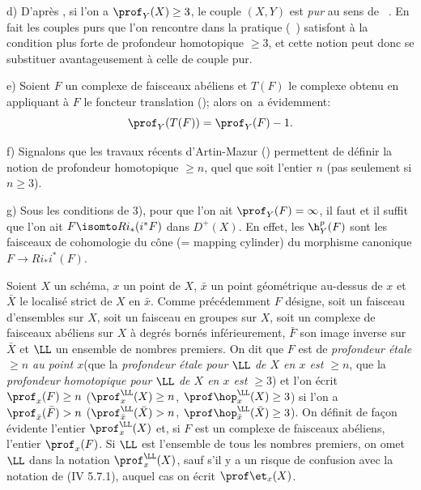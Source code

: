 \begin{remarques}
d) D'apr\`es , si l'on a $\prof_Y(X)\geq 3$, le couple $(X, Y)$ est \textit{pur} au sens de ~. En fait les couples purs que l'on rencontre dans la pratique (\cf {}~) satisfont \`a la condition plus forte de profondeur homotopique $\geq 3$, et cette notion peut donc se substituer avantageusement \`a celle de couple pur.

e) Soient $F$ un complexe de faisceaux ab\'eliens et $T(F)$ le complexe obtenu en appliquant \`a $F$ le foncteur translation (\cite{XIV.3}); alors on~a \'evidemment:
$$
\prof_Y(T(F))=\prof_Y(F)-1.
$$

f) Signalons que les travaux r\'ecents d'Artin-Mazur (\cite{XIV.1}) permettent de d\'efinir la notion de profondeur homotopique $\geq n$, quel que soit l'entier $n$ (pas seulement si $n\geq 3$).

g) Sous les conditions de  3), pour que l'on ait $\prof_Y(F)=\infty$, il faut et il suffit que l'on ait $F\isomto Ri_*(i^*F)$ dans $D^+(X)$. En effet, les ${\h}_Y^p(F)$ sont les faisceaux de cohomologie du c\^{o}ne (= mapping cylinder) du morphisme canonique $F\to Ri_*i^*(F)$.
\end{remarques}

\begin{definition} \label{XIV.1.7}
Soient $X$ un sch\'ema, $x$ un point de $X$, $\bar x$ un point g\'eom\'etrique au-dessus de $x$ et $\bar X$ le localis\'e strict de $X$ en $\bar x$. Comme pr\'ec\'edemment $F$ d\'esigne, soit un faisceau d'ensembles sur $X$, soit un faisceau en groupes sur $X$, soit un complexe de faisceaux ab\'eliens sur $X$ \`a degr\'es born\'es inf\'erieurement, $\bar F$ son image inverse sur~$\bar X$ et $\LL$ un ensemble de nombres premiers. On dit que $F$ est de \emph{profondeur \'etale $\geq n$ au point $x$}\pageoriginale (\resp que la \emph{profondeur \'etale pour $\LL$ de $X$ en $x$ est $\geq n$}, \resp que la \emph{profondeur homotopique pour $\LL$ de $X$ en $x$ est $\geq 3$}) et l'on \'ecrit $\prof_x(F)\geq n$ (\resp $\prof_x^{\LL}(X)\geq n$, \resp $\prof \hop_x^{\LL}(X)\geq 3$) si l'on a $\prof_{\bar x}(\bar F)>n$ (\resp $\prof_{\bar x}^{\LL}(\bar X)>\nobreak n$, \resp $\prof \hop_{\bar x}^{\LL}(\bar X)\geq 3$). On d\'efinit de fa\c con \'evidente l'entier $\prof_x^{\LL}(X)$ et, si $F$ est un complexe de faisceaux ab\'eliens, l'entier $\prof_x(F)$. Si $\LL$ est l'ensemble de tous les nombres premiers, on omet $\LL$ dans la notation $\prof_x^{\LL}(X)$, sauf s'il y a un risque de confusion avec la notation de \textup{(\EGA IV 5.7.1)}, auquel cas on \'ecrit $\prof \et_x(X)$.
\end{definition}


